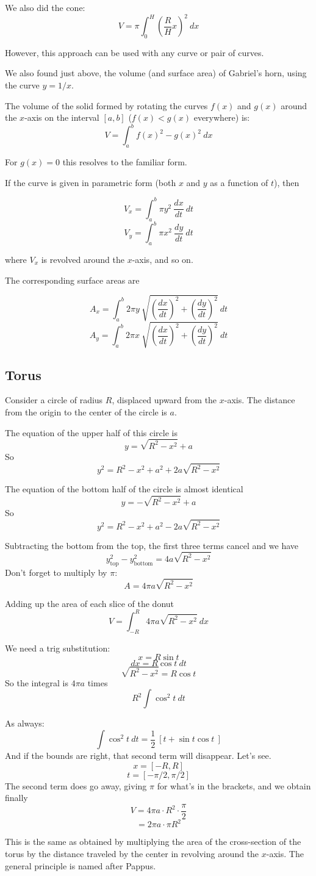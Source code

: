 \documentclass[11pt, oneside]{article}
\begin{document}
We also did the cone:
\[ V = \pi \int_0^H ( \frac{R}{H} x)^2 \ dx \]

However, this approach can be used with any curve or pair of curves.

We also found just above, the volume (and surface area) of Gabriel's horn, using the curve $y = 1/x$.

The volume of the solid formed by rotating the curves $f(x)$ and $g(x)$ around the $x$-axis on the interval $[a,b]$ ($f(x) < g(x)$ everywhere) is:
\[ V = \int_a^b f(x)^2 - g(x)^2 \ dx \]

For $g(x) = 0$ this resolves to the familiar form.

If the curve is given in parametric form (both $x$ and $y$ as a function of $t$), then

\[ V_x = \int_a^b \pi y^2 \ \frac{dx}{dt} \ dt \]
\[ V_y = \int_a^b \pi x^2 \ \frac{dy}{dt} \ dt \]

where $V_x$ is revolved around the $x$-axis, and so on.

The corresponding surface areas are

\[ A_x = \int_a^b 2 \pi y \ \sqrt{(\frac{dx}{dt})^2 + (\frac{dy}{dt})^2} \ dt \]
\[ A_y = \int_a^b 2 \pi x \ \sqrt{(\frac{dx}{dt})^2 + (\frac{dy}{dt})^2} \ dt \]

\subsection*{Torus}
Consider a circle of radius $R$, displaced upward from the $x$-axis.  The distance from the origin to the center of the circle is $a$.

The equation of the upper half of this circle is
\[ y = \sqrt{R^2 - x^2} + a  \]
So
\[ y^2 = R^2 - x^2 + a^2 + 2 a \sqrt{R^2 - x^2} \]

The equation of the bottom half of the circle is almost identical
\[ y  = -\sqrt{R^2 - x^2} + a  \]
So
\[ y^2 = R^2 - x^2 + a^2 - 2 a \sqrt{R^2 - x^2} \]

Subtracting the bottom from the top, the first three terms cancel and we have
\[ y_{\text{top}}^2 - y_{\text{bottom}}^2 = 4 a \sqrt{R^2 - x^2} \]
Don't forget to multiply by $\pi$:
\[ A = 4 \pi a \sqrt{R^2 - x^2} \]

Adding up the area of each slice of the donut
\[ V = \int_{-R}^{R} 4 \pi a \sqrt{R^2 - x^2} \ dx \]

We need a trig substitution:
\[ x = R \sin t \]
\[ dx = R \cos t \ dt \]
\[ \sqrt{R^2 - x^2} = R \cos t \]
So the integral is $4 \pi a$ times
\[ R^2 \int \cos^2 t \ dt \]

As always:
\[ \int \cos^2 t \ dt = \frac{1}{2} \ [ t + \sin t \cos t \ ]  \]
And if the bounds are right, that second term will disappear.  Let's see.
\[ x = [-R,R] \]
\[ t = [-\pi/2,\pi/2] \]
The second term does go away, giving $\pi$ for what's in the brackets, and we obtain finally
\[ V = 4 \pi a \cdot R^2 \cdot \frac{\pi}{2} \]
\[ = 2 \pi a \cdot \pi R^2 \]

This is the same as obtained by multiplying the area of the cross-section of the torus by the distance traveled by the center in revolving around the $x$-axis.  The general principle is named after Pappus.
\end{document}
